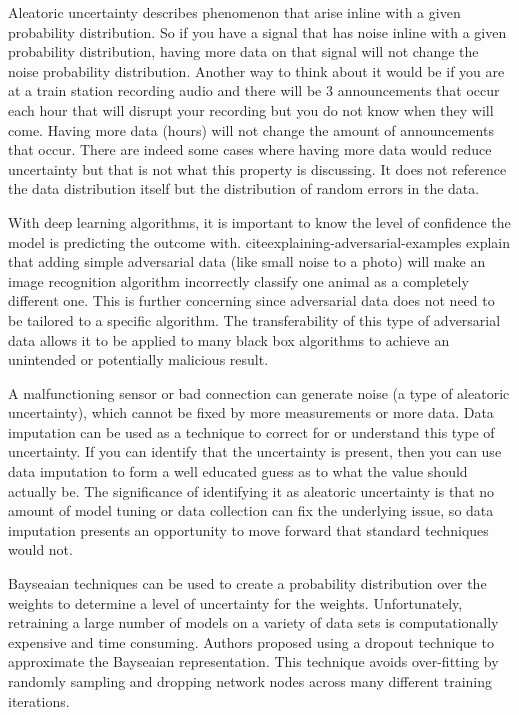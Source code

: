 Aleatoric uncertainty describes phenomenon that arise inline with a given probability distribution. So if you have a signal that has noise inline with a given probability distribution, having more data on that signal will not change the noise probability distribution. Another way to think about it would be if you are at a train station recording audio and there will be 3 announcements that occur each hour that will disrupt your recording but you do not know when they will come. Having more data (hours) will not change the amount of announcements that occur. There are indeed some cases where having more data would reduce uncertainty but that is not what this property is discussing. It does not reference the data distribution itself but the distribution of random errors in the data.

With deep learning algorithms, it is important to know the level of confidence the model is predicting the outcome with. cite{explaining-adversarial-examples} explain that adding simple adversarial data (like small noise to a photo) will make an image recognition algorithm incorrectly classify one animal as a completely different one. This is further concerning since adversarial data does not need to be tailored to a specific algorithm. The transferability of this type of adversarial data allows it to be applied to many black box algorithms to achieve an unintended or potentially malicious result. 

A malfunctioning sensor or bad connection can generate noise (a type of aleatoric uncertainty), which cannot be fixed by more measurements or more data. Data imputation can be used as a technique to correct for or understand this type of uncertainty. If you can identify that the uncertainty is present, then you can use data imputation to form a well educated guess as to what the value should actually be. The significance of identifying it as aleatoric uncertainty is that no amount of model tuning or data collection can fix the underlying issue, so data imputation presents an opportunity to move forward that standard techniques would not.

Bayseaian techniques can be used to create a probability distribution over the weights to determine a level of uncertainty for the weights. Unfortunately, retraining a large number of models on a variety of data sets is computationally expensive and time consuming. Authors \cite{gal2016dropout} proposed using a dropout technique to approximate the Bayseaian representation. This technique avoids over-fitting by randomly sampling and dropping network nodes across many different training iterations.

